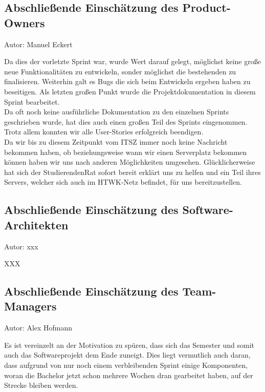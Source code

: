 \subsection{Abschließende Einschätzung des Product-Owners}
{\small Autor: Manuel Eckert}

Da dies der vorletzte Sprint war, wurde Wert darauf gelegt, möglichst keine große neue Funktionalitäten zu entwickeln, sonder möglichst die bestehenden zu finalisieren. Weiterhin galt es Bugs die sich beim Entwickeln ergeben haben zu beseitigen. Als letzten großen Punkt wurde die Projektdokumentation in diesem Sprint bearbeitet. \\
Da oft noch keine ausführliche Dokumentation zu den einzelnen Sprints geschrieben wurde, hat dies auch einen großen Teil des Sprints eingenommen. Trotz allem konnten wir alle User-Stories erfolgreich beendigen. \\
Da wir bis zu diesem Zeitpunkt vom ITSZ immer noch keine Nachricht bekommen haben, ob beziehungsweise wann wir einen Serverplatz bekommen können haben wir uns nach anderen Möglichkeiten umgesehen. Glücklicherweise hat sich der StudierendenRat sofort bereit erklärt uns zu helfen und ein Teil ihres Servers, welcher sich auch im HTWK-Netz befindet, für uns bereitzustellen.

\subsection{Abschließende Einschätzung des Software-Architekten}
{\small Autor: xxx}

XXX

\subsection{Abschließende Einschätzung des Team-Managers}
{\small Autor: Alex Hofmann}

Es ist vereinzelt an der Motivation zu spüren, dass sich das Semester und somit auch das Softwareprojekt dem Ende zuneigt.
Dies liegt vermutlich auch daran, dass aufgrund von nur noch einem verbleibenden Sprint einige Komponenten, woran die Bachelor jetzt schon mehrere Wochen dran gearbeitet haben, auf der Strecke bleiben werden.
